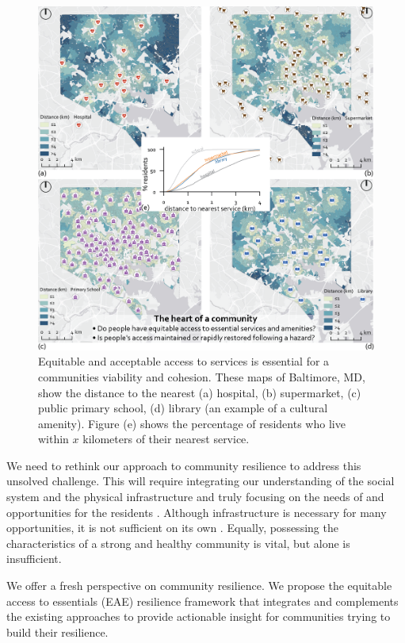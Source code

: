 \documentclass[onecolumn,doublespacing]{risa}
\let \cite \parencite
\begin{document}
\begin{figure}
    \centering
    \includegraphics[width=\linewidth]{report/fig/fig_bal.png}
    \caption{Equitable and acceptable access to services is essential for a communities viability and cohesion. These maps of Baltimore, MD, show the distance to the nearest (a) hospital, (b) supermarket, (c) public primary school, (d) library (an example of a cultural amenity). Figure (e) shows the percentage of residents who live within $x$ kilometers of their nearest service.
    }
    \label{fig:bal_services}
\end{figure}

We need to rethink our approach to community resilience to address this unsolved challenge.
This will require integrating our understanding of the social system and the physical infrastructure and truly focusing on the needs of and opportunities for the residents \cite{Koliou2018-jt, Cutter2016-landscape}.
Although infrastructure is necessary for many opportunities, it is not sufficient on its own \cite{Doorn2018-fx}.
Equally, possessing the characteristics of a strong and healthy community is vital, but alone is insufficient.

We offer a fresh perspective on community resilience.
We propose the equitable access to essentials (EAE) resilience framework that integrates and complements the existing approaches to provide actionable insight for communities trying to build their resilience.
\end{document}
